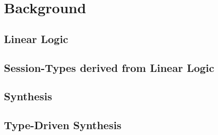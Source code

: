 
%

\chapter{Background}
\label{cha:background}

\glsresetall

\section{Linear Logic}
\label{sec:linear_logic}

\section{Session-Types derived from Linear Logic}
\label{sec:session_types_derived_from_linear_logic}

\section{Synthesis}
\label{sec:synthesis}

\section{Type-Driven Synthesis}
\label{sec:type_driven_synthesis}
